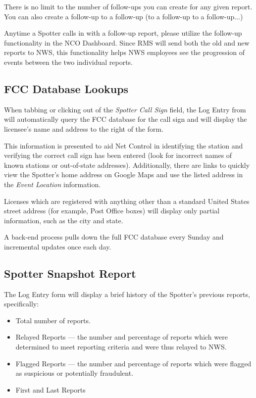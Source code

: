 \documentclass[pdflatex,letterpaper,twoside,12pt]{book}
\begin{document}
There is no limit to the number of follow-ups you can create for any given report.  You can also create a follow-up to a follow-up (to a follow-up to a follow-up...)

Anytime a Spotter calls in with a follow-up report, please utilize the follow-up functionality in the NCO Dashboard.  Since RMS will send both the old and new reports to NWS, this functionality helps NWS employees see the progression of events between the two individual reports.

\subsection{FCC Database Lookups}

When tabbing or clicking out of the \emph{Spotter Call Sign} field, the Log Entry from will automatically query the FCC database for the call sign and will display the licensee's name and address to the right of the form.

This information is presented to aid Net Control in identifying the station and verifying the correct call sign has been entered (look for incorrect names of known stations or out-of-state addresses).  Additionally, there are links to quickly view the Spotter's home address on Google Maps and use the listed address in the \emph{Event Location} information.


Licenses which are registered with anything other than a standard United States street address (for example, Post Office boxes) will display only partial information, such as the city and state.

A back-end process pulls down the full FCC database every Sunday and incremental updates once each day.

\subsection{Spotter Snapshot Report}

The Log Entry form will display a brief history of the Spotter's previous reports, specifically:

\begin{itemize}
\item Total number of reports.
\item Relayed Reports --- the number and percentage of reports which were determined to meet reporting criteria and were thus relayed to NWS.
\item Flagged Reports --- the number and percentage of reports which were flagged as suspicious or potentially fraudulent.
\item First and Last Reports
\end{itemize}
\end{document}
